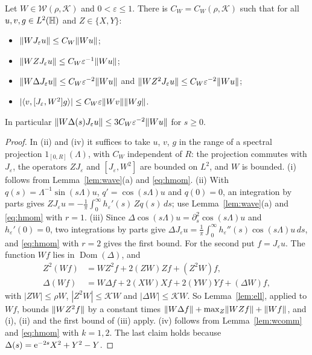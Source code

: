 \begin{lemma}\label{lem:wmoll}
Let $W\in\mathcal W(\rho,\mathcal K)$ and $0<\varepsilon\le1$. There is $C_W=C_W(\rho,\mathcal K)$ such that for all $u,v,g\in L^2(\mathbb{H})$ and
$Z\in\{X,Y\}$:
\begin{itemize}
\item[(i)] $\lVert WJ_\varepsilon u\rVert\le C_W\lVert Wu\rVert$;
\item[(ii)] $\lVert WZJ_\varepsilon u\rVert\le C_W\varepsilon^{-1}\lVert Wu\rVert$;
\item[(iii)] $\lVert W\Delta J_\varepsilon u\rVert\le C_W\varepsilon^{-2}\lVert Wu\rVert$ and $\lVert WZ^2J_\varepsilon u\rVert\le C_W\varepsilon^{-2}\lVert Wu\rVert$;
\item[(iv)] $|\langle v,[J_\varepsilon,W^2]g\rangle|\le C_W\varepsilon\lVert Wv\rVert\lVert Wg\rVert$.
\end{itemize}
In particular $\lVert W\Delta(s)J_\varepsilon u\rVert\le3C_W\varepsilon^{-2}\lVert Wu\rVert$ for $s\ge0$.
\end{lemma}
\begin{proof}
In (ii) and (iv) it suffices to take $u$, $v$, $g$ in the range of a spectral projection $1_{[0,R]}(\Lambda)$, with $C_W$ independent of
$R$: the projection commutes with $J_\varepsilon$, the operators $ZJ_\varepsilon$ and $[J_\varepsilon,W^2]$ are bounded on $L^2$, and $W$ is bounded.
(i) follows from Lemma~\ref{lem:wave}(a) and \eqref{eq:hmom}. (ii) With $q(s)=\Lambda^{-1}\sin(s\Lambda)u$, $q'=\cos(s\Lambda)u$ and
$q(0)=0$, an integration by parts gives $ZJ_\varepsilon u=-\tfrac1\pi\int_0^\infty h_\varepsilon'(s)\,Zq(s)\,ds$; use
Lemma~\ref{lem:wave}(a) and \eqref{eq:hmom} with $r=1$. (iii) Since $\Delta\cos(s\Lambda)u=\partial_s^2\cos(s\Lambda)u$ and
$h_\varepsilon'(0)=0$, two integrations by parts give $\Delta J_\varepsilon u=\tfrac1\pi\int_0^\infty h_\varepsilon''(s)\cos(s\Lambda)u\,ds$, and
\eqref{eq:hmom} with $r=2$ gives the first bound. For the second put $f=J_\varepsilon u$. The function $Wf$ lies in
$\operatorname{Dom}(\Delta)$, and
\begin{align*}
Z^2(Wf)&=WZ^2f+2(ZW)Zf+(Z^2W)f,\\
\Delta(Wf)&=W\Delta f+2(XW)Xf+2(YW)Yf+(\Delta W)f,
\end{align*}
with $|ZW|\le\rho W$, $|Z^2W|\le\mathcal KW$ and $|\Delta W|\le\mathcal KW$. So Lemma~\ref{lem:ell}, applied to $Wf$, bounds
$\lVert WZ^2f\rVert$ by a constant times $\lVert W\Delta f\rVert+\max_Z\lVert WZf\rVert+\lVert Wf\rVert$, and (i), (ii) and the first bound of (iii) apply. (iv) follows from
Lemma~\ref{lem:wcomm} and \eqref{eq:hmom} with $k=1,2$. The last claim holds because $\Delta(s)=\mathrm{e}^{-2s}X^2+Y^2-Y$.
\end{proof}

